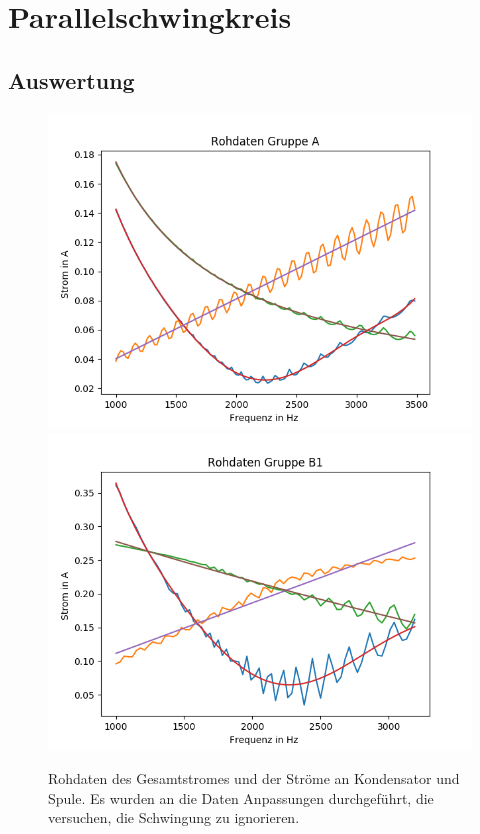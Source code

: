 \documentclass[12pt,a4paper]{article}
\begin{document}
\section{Parallelschwingkreis}

\subsection{Auswertung}
\begin{figure}
\centering
\includegraphics[scale=1]{Bilder/Parallel_Rohdaten.png}
\includegraphics[scale=1]{Bilder/Parallel_RohdatenB.png}
\caption{Rohdaten des Gesamtstromes und der Ströme an Kondensator und Spule. Es wurden an die Daten Anpassungen durchgeführt, die versuchen, die Schwingung zu ignorieren.}
\label{fig:parallel_Rohdaten}
\end{figure}
\end{document}
